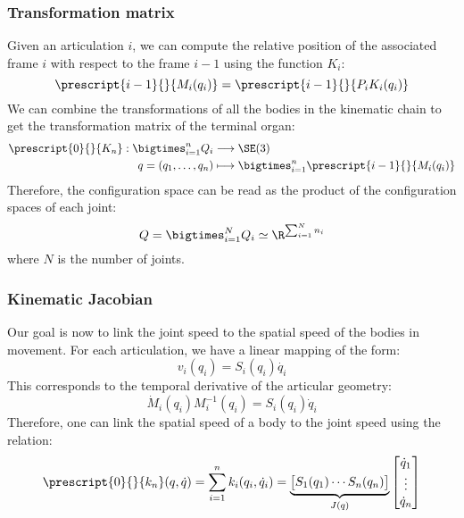 \subsubsection{Transformation matrix}
Given an articulation $i$, we can compute the relative position of the associated frame $i$ with respect to the frame $i-1$ using the function $K_i$:
\begin{equation*}
    \prescript{i-1}{}{M_i(q_i)} = \prescript{i-1}{}{P_iK_i(q_i)}
\end{equation*}
We can combine the transformations of all the bodies in the kinematic chain to get the transformation matrix of the terminal organ:
\begin{equation*}
    \begin{aligned}
        \prescript{0}{}{K_n} : \bigtimes_{i=1}^n Q_i &\longrightarrow \SE(3)\\
        q=(q_1, \dots, q_n) &\longmapsto \bigtimes_{i=1}^n \prescript{i-1}{}{M_i(q_i)}
    \end{aligned}
\end{equation*}
Therefore, the configuration space can be read as the product of the configuration spaces of each joint:
\begin{equation*}
    Q = \bigtimes_{i=1}^N Q_i \simeq \R^{\sum_{i=1}^N n_i}
\end{equation*}
where $N$ is the number of joints.

\subsubsection{Kinematic Jacobian}
Our goal is now to link the joint speed to the spatial speed of the bodies in movement. For each articulation, we have a linear mapping of the form:
\begin{equation*}
    v_i(q_i) = S_i(q_i)\dot{q_i}
\end{equation*}
This corresponds to the temporal derivative of the articular geometry:
\begin{equation*}
    \dot{M}_i(q_i)M_i^{-1}(q_i) = S_i(q_i)\dot{q}_i
\end{equation*}
Therefore, one can link the spatial speed of a body to the joint speed using the relation:
\begin{equation*}
    \prescript{0}{}{k_n}(q, \dot{q}) = \sum_{i=1}^n k_i(q_i, \dot{q}_i) = \underbrace{\begin{bmatrix}
        S_1(q_1) \cdots S_n(q_n)
    \end{bmatrix}}_{J(q)}
    \begin{bmatrix}
        \dot{q}_1\\\vdots\\\dot{q}_n
    \end{bmatrix}
\end{equation*}